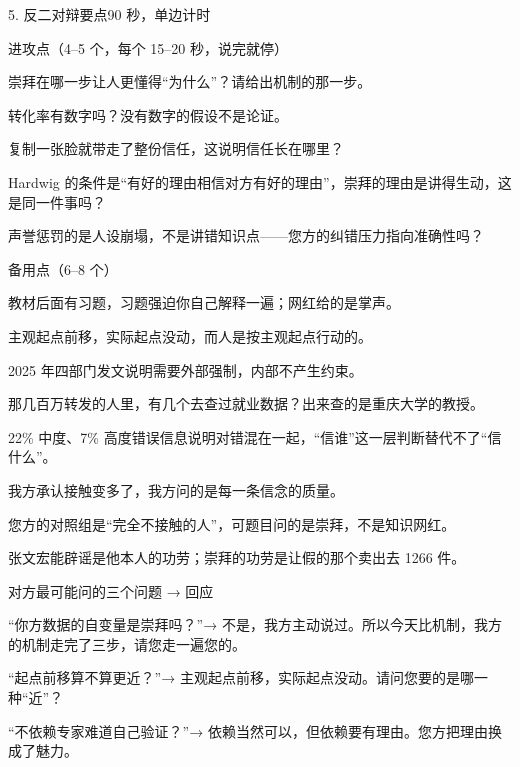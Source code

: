 \documentclass[script,con]{debate}
\begin{document}
\begin{stage}{5. 反二对辩要点}{90 秒，单边计时}
\begin{points}{进攻点（4–5 个，每个 15–20 秒，说完就停）}
\item 崇拜在哪一步让人更懂得“为什么”？请给出机制的那一步。
\item 转化率有数字吗？没有数字的假设不是论证。
\item 复制一张脸就带走了整份信任，这说明信任长在哪里？
\item Hardwig 的条件是“有好的理由相信对方有好的理由”，崇拜的理由是讲得生动，这是同一件事吗？
\item 声誉惩罚的是人设崩塌，不是讲错知识点——您方的纠错压力指向准确性吗？
\end{points}
\begin{points}{备用点（6–8 个）}
\item 教材后面有习题，习题强迫你自己解释一遍；网红给的是掌声。
\item 主观起点前移，实际起点没动，而人是按主观起点行动的。
\item 2025 年四部门发文说明需要外部强制，内部不产生约束。
\item 那几百万转发的人里，有几个去查过就业数据？出来查的是重庆大学的教授。
\item 22\% 中度、7\% 高度错误信息说明对错混在一起，“信谁”这一层判断替代不了“信什么”。
\item 我方承认接触变多了，我方问的是每一条信念的质量。
\item 您方的对照组是“完全不接触的人”，可题目问的是崇拜，不是知识网红。
\item 张文宏能辟谣是他本人的功劳；崇拜的功劳是让假的那个卖出去 1266 件。
\end{points}
\begin{points}{对方最可能问的三个问题 → 回应}
\item “你方数据的自变量是崇拜吗？”→ 不是，我方主动说过。所以今天比机制，我方的机制走完了三步，请您走一遍您的。
\item “起点前移算不算更近？”→ 主观起点前移，实际起点没动。请问您要的是哪一种“近”？
\item “不依赖专家难道自己验证？”→ 依赖当然可以，但依赖要有理由。您方把理由换成了魅力。
\end{points}
\end{stage}
\end{document}
